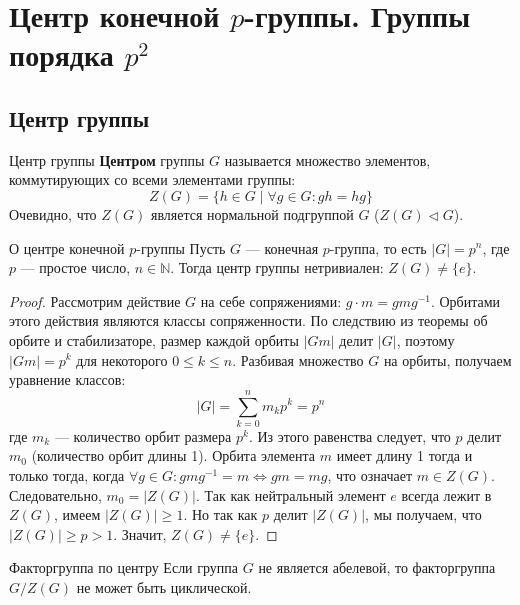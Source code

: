 \section{Центр конечной $p$-группы. Группы порядка $p^2$}

\subsection*{Центр группы}

\begin{Definition}{Центр группы}{}
	\textbf{Центром} группы $G$ называется множество элементов, коммутирующих со всеми элементами группы:
	\[ Z(G) = \{h \in G \mid \forall g \in G \colon gh = hg\} \] 
	Очевидно, что $Z(G)$ является нормальной подгруппой $G$ ($Z(G) \triangleleft G$).
\end{Definition}

\begin{Theorem}{О центре конечной $p$-группы}{}
	Пусть $G$ — конечная $p$-группа, то есть $|G| = p^n$, где $p$ — простое число, $n \in \mathbb{N}$. Тогда центр группы нетривиален: $Z(G) \neq \{e\}$.
\end{Theorem}

\begin{proof}
	Рассмотрим действие $G$ на себе сопряжениями: $g \cdot m = gmg^{-1}$.
	Орбитами этого действия являются классы сопряженности.
	По следствию из теоремы об орбите и стабилизаторе, размер каждой орбиты $|Gm|$ делит $|G|$, поэтому $|Gm| = p^k$ для некоторого $0 \le k \le n$.
	Разбивая множество $G$ на орбиты, получаем уравнение классов:
	\[ |G| = \sum_{k=0}^{n} m_k p^k = p^n \]
	где $m_k$ — количество орбит размера $p^k$.
	Из этого равенства следует, что $p$ делит $m_0$ (количество орбит длины 1).
	Орбита элемента $m$ имеет длину 1 тогда и только тогда, когда $\forall g \in G \colon gmg^{-1} = m \iff gm = mg$, что означает $m \in Z(G)$.
	Следовательно, $m_0 = |Z(G)|$. Так как нейтральный элемент $e$ всегда лежит в $Z(G)$, имеем $|Z(G)| \ge 1$.
	Но так как $p$ делит $|Z(G)|$, мы получаем, что $|Z(G)| \ge p > 1$. Значит, $Z(G) \neq \{e\}$.
\end{proof}

\begin{Lemma}{Факторгруппа по центру}{}
	Если группа $G$ не является абелевой, то факторгруппа $G/Z(G)$ не может быть циклической.
\end{Lemma}

